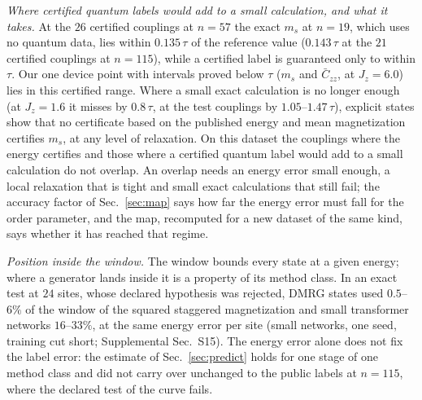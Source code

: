 \documentclass[aps,prx,twocolumn,10pt,superscriptaddress,nofootinbib,longbibliography,floatfix]{revtex4-2}
\theoremstyle{remark}
\newcommand{\Jz}{J_z}
\newcommand{\ms}{m_s}
\newcommand{\Czz}{\bar C_{zz}}
\begin{document}
\emph{Where certified quantum labels would add to a small calculation, and what it takes.} At the $26$ certified couplings %
at $n=57$ the exact $\ms$ at $n=19$, which uses no quantum data, lies within $0.135\,\tau$ of the reference value %
($0.143\,\tau$ at the $21$ certified couplings at $n=115$), while a certified label is guaranteed only to within %
$\tau$. Our one device point with intervals proved below $\tau$ ($\ms$ and $\Czz$, at $\Jz=6.0$) lies in this certified range. %
Where a small exact calculation is no longer enough (at $\Jz=1.6$ it misses by $0.8\,\tau$, at the test %
couplings by $1.05$--$1.47\,\tau$), explicit states show that no certificate based on the published energy and mean %
magnetization certifies $\ms$, at any level of relaxation. On this dataset the couplings where
the energy certifies and those where a
certified quantum label would add to a small calculation do not overlap. An overlap needs an energy error small enough, a local
relaxation that is tight and small exact calculations that still fail; the accuracy factor of Sec.~\ref{sec:map}
says how far the energy error must fall for the order parameter, and the map, recomputed for a new dataset of the same kind, says whether
it has reached that regime.

\emph{Position inside the window.} The window bounds every state at a given energy; where a generator lands inside it
is a property of its method class. In an exact test at $24$ sites, whose declared hypothesis was rejected, DMRG %
states used $0.5$--$6\%$ of the window of the squared staggered magnetization and small transformer networks %
$16$--$33\%$, at the same energy error per site (small networks, one seed, training cut short; Supplemental Sec.~S15). %
The energy error alone does not fix the label error: the estimate of Sec.~\ref{sec:predict} holds for one stage of
one method class and did not carry over unchanged to the public labels at $n=115$, where the declared test of the %
curve fails.
\end{document}
